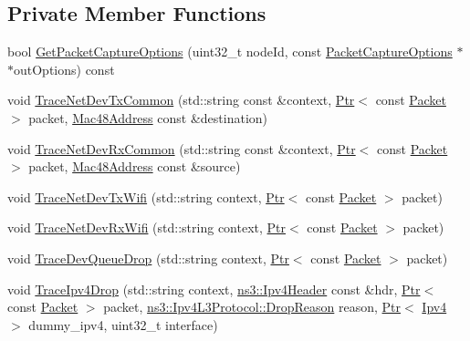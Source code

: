 \subsection*{Private Member Functions}
\begin{DoxyCompactItemize}
\item 
bool \hyperlink{classns3_1_1PyViz_ae78d7025e4dc17203d654789bc9aa829}{Get\+Packet\+Capture\+Options} (uint32\+\_\+t node\+Id, const \hyperlink{structns3_1_1PyViz_1_1PacketCaptureOptions}{Packet\+Capture\+Options} $\ast$$\ast$out\+Options) const 
\item 
void \hyperlink{classns3_1_1PyViz_a636f858be77ba74d25f68338776990d7}{Trace\+Net\+Dev\+Tx\+Common} (std\+::string const \&context, \hyperlink{classns3_1_1Ptr}{Ptr}$<$ const \hyperlink{classns3_1_1Packet}{Packet} $>$ packet, \hyperlink{classns3_1_1Mac48Address}{Mac48\+Address} const \&destination)
\item 
void \hyperlink{classns3_1_1PyViz_a9b8b6e5900fd7b1bdca524f3f9acc018}{Trace\+Net\+Dev\+Rx\+Common} (std\+::string const \&context, \hyperlink{classns3_1_1Ptr}{Ptr}$<$ const \hyperlink{classns3_1_1Packet}{Packet} $>$ packet, \hyperlink{classns3_1_1Mac48Address}{Mac48\+Address} const \&source)
\item 
void \hyperlink{classns3_1_1PyViz_ae4136d77a02d183111343f4cb02c6c01}{Trace\+Net\+Dev\+Tx\+Wifi} (std\+::string context, \hyperlink{classns3_1_1Ptr}{Ptr}$<$ const \hyperlink{classns3_1_1Packet}{Packet} $>$ packet)
\item 
void \hyperlink{classns3_1_1PyViz_ac785f73ba91713d993c8174b7eb1def3}{Trace\+Net\+Dev\+Rx\+Wifi} (std\+::string context, \hyperlink{classns3_1_1Ptr}{Ptr}$<$ const \hyperlink{classns3_1_1Packet}{Packet} $>$ packet)
\item 
void \hyperlink{classns3_1_1PyViz_aca887271be7381092692957e7b15f3d8}{Trace\+Dev\+Queue\+Drop} (std\+::string context, \hyperlink{classns3_1_1Ptr}{Ptr}$<$ const \hyperlink{classns3_1_1Packet}{Packet} $>$ packet)
\item 
void \hyperlink{classns3_1_1PyViz_a57f7bbe502a7ce922ca977d0a1bcd01b}{Trace\+Ipv4\+Drop} (std\+::string context, \hyperlink{classns3_1_1Ipv4Header}{ns3\+::\+Ipv4\+Header} const \&hdr, \hyperlink{classns3_1_1Ptr}{Ptr}$<$ const \hyperlink{classns3_1_1Packet}{Packet} $>$ packet, \hyperlink{classns3_1_1Ipv4L3Protocol_a05e7403d60c79529257c4cffdd994da1}{ns3\+::\+Ipv4\+L3\+Protocol\+::\+Drop\+Reason} reason, \hyperlink{classns3_1_1Ptr}{Ptr}$<$ \hyperlink{classns3_1_1Ipv4}{Ipv4} $>$ dummy\+\_\+ipv4, uint32\+\_\+t interface)
\item 
$$
\end{DoxyCompactItemize}
